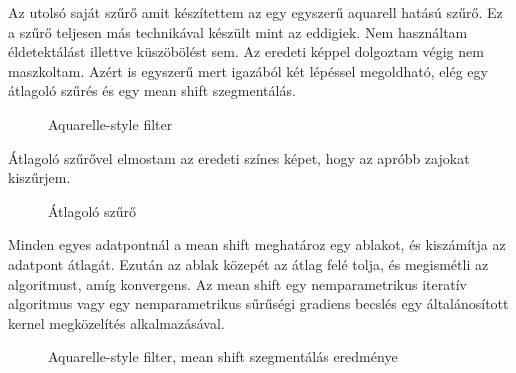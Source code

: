 \newpage
{}
Az utolsó saját szűrő amit készítettem az egy egyszerű aquarell hatású szűrő. Ez a szűrő teljesen más technikával készült mint az eddigiek. Nem használtam éldetektálást illettve küszöbölést sem. Az eredeti képpel dolgoztam végig nem maszkoltam. Azért is egyszerű mert igazából két lépéssel megoldható, elég egy átlagoló szűrés és egy mean shift szegmentálás.
\begin{figure}[ht]
\centering
{}
\caption{Aquarelle-style filter} 
\label{fig:  paint}
\end{figure}
Átlagoló szűrővel elmostam az eredeti színes képet, hogy az apróbb zajokat kiszűrjem.
\begin{figure}[ht]
\centering
{}
\caption{Átlagoló szűrő  } 
\label{fig: paint1}
\end{figure}
Minden egyes adatpontnál a mean shift meghatároz egy ablakot, és kiszámítja az adatpont átlagát. Ezután az ablak közepét az átlag felé tolja, és megismétli az algoritmust, amíg konvergens. Az mean shift egy nemparametrikus iteratív algoritmus vagy egy nemparametrikus sűrűségi gradiens becslés egy általánosított kernel megközelítés alkalmazásával.
\begin{figure}[ht]
\centering
{}
\caption{Aquarelle-style filter, mean shift szegmentálás  eredménye} 
\label{fig: paint1}
\end{figure}
